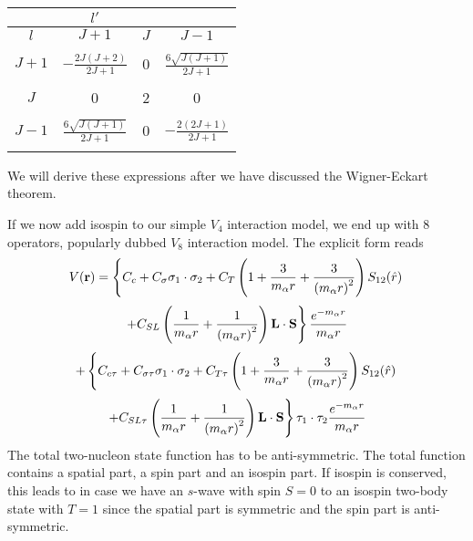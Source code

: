 \documentclass[graybox,sectrefs,envcountresetchap,open=right]{svmonodo}
\begin{document}
\begin{center}

\begin{tabular}{cccc}
\hline
\multicolumn{1}{c}{  } & \multicolumn{1}{c}{ $l'$ } & \multicolumn{1}{c}{  } & \multicolumn{1}{c}{  } \\
\hline
$l$   & $J+1$                         & $J$ & $J-1$                         \\
\hline
      &                               &     &                               \\
$J+1$ & $-\frac{2J(J+2)}{2J+1}$       & 0   & $\frac{6\sqrt{J(J+1)}}{2J+1}$ \\
      &                               &     &                               \\
$J$   & 0                             & 2   & 0                             \\
      &                               &     &                               \\
$J-1$ & $\frac{6\sqrt{J(J+1)}}{2J+1}$ & 0   & $-\frac{2(2J+1)}{2J+1}$       \\
      &                               &     &                               \\
\hline
\end{tabular}

\end{center}


\noindent
We will derive these expressions after we have discussed the Wigner-Eckart theorem. 

\noindent
If we now add isospin to our simple $V_4$ interaction model, we end up with $8$ operators, popularly dubbed $V_8$ interaction model. The explicit form reads
\[
V(\mathbf{r})= \left\{ C_c + C_\mathbf{\sigma} \mathbf{\sigma}_1\cdot\mathbf{\sigma}_2
 + C_T \left( 1 + {3\over m_\alpha r} + {3\over
\left(m_\alpha r\right)^2}\right) S_{12} (\hat r)\right. 
\]
\[
\left. + C_{SL} \left( {1\over m_\alpha r} + {1\over \left( m_\alpha r\right)^2}
\right) \mathbf{L}\cdot \mathbf{S}
\right\} \frac{e^{-m_\alpha r}}{m_\alpha r}
\]
\[
+ \left\{ C_{c\tau} + C_{\sigma\tau}\mathbf{\sigma}_1\cdot\mathbf{\sigma}_2
 + C_{T\tau} \left( 1 + {3\over m_\alpha r} + {3\over
\left(m_\alpha r\right)^2}\right) S_{12} (\hat r)\right. 
\]
\[
\left. + C_{SL\tau} \left( {1\over m_\alpha r} + {1\over \left( m_\alpha r\right)^2}
\right) \mathbf{L}\cdot \mathbf{S}
\right\}\mathbf{\tau}_1\cdot\mathbf{\tau}_2 \frac{e^{-m_\alpha r}}{m_\alpha r}
\]
The total two-nucleon state function has to be anti-symmetric. The total function contains a spatial part, a spin part and an isospin part. If isospin is conserved, this leads to in case we have an $s$-wave with spin $S=0$ to an isospin 
two-body state with $T=1$ since the spatial part is symmetric and the spin part is anti-symmetric. 
\end{document}
